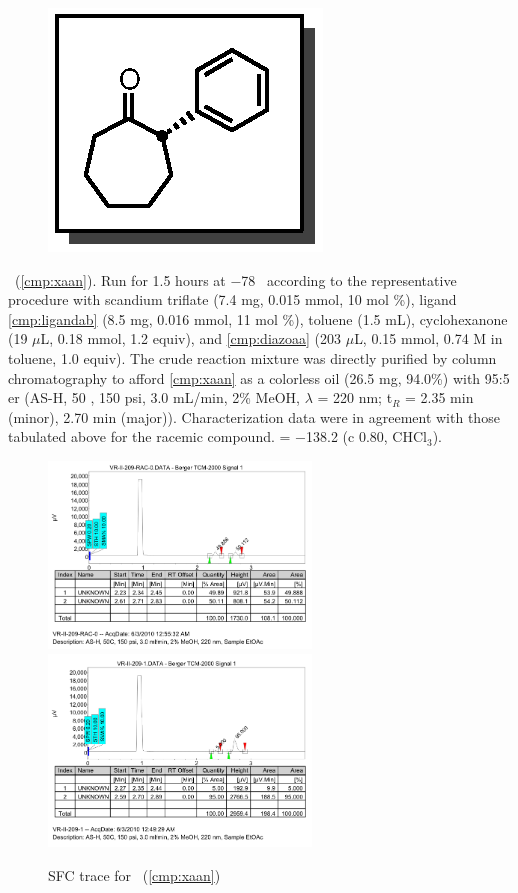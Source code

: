 \pagebreak
\begin{figure}
  \vspace{-22pt}
  \begin{center}
    \includegraphics[scale=0.8]{chp_asymmetric/images/xaan}
  \end{center}
  \vspace{-30pt}
\end{figure}\noindent \textbf{\CMPxaan}\ (\ref{cmp:xaan}). Run for 1.5 hours
at $-$78 \degc\  according to the representative procedure with scandium triflate (7.4
mg, 0.015 mmol, 10 mol \%), ligand \ref{cmp:ligandab} (8.5 mg, 0.016 mmol, 11
mol \%), toluene (1.5 mL), cyclohexanone (19 $\mu$L, 0.18 mmol, 1.2 equiv), and
\ref{cmp:diazoaa} (203 $\mu$L, 0.15 mmol, 0.74 M in toluene, 1.0 equiv). The
crude reaction mixture was directly purified by column chromatography to afford
\ref{cmp:xaan} as a colorless oil (26.5 mg, 94.0\%) with 95:5 er (AS-H, 50
\degc, 150 psi, 3.0 mL/min, 2\% MeOH, $\lambda$ = 220 nm; t$_R$ = 2.35 min
(minor), 2.70 min (major)). Characterization data were in agreement with those
tabulated above for the racemic compound. \rotation = $-$138.2 (c 0.80,
CHCl$_3$).
\\
\begin{figure}[h]
\centering
\includegraphics[width=2.75in]{chp_asymmetric/images/sfc/xaan-rac.png}
\includegraphics[width=2.75in]{chp_asymmetric/images/sfc/xaan.png}
\caption{SFC trace for \CMPxaan~(\ref{cmp:xaan})}
\vspace{-10pt}
\end{figure}

